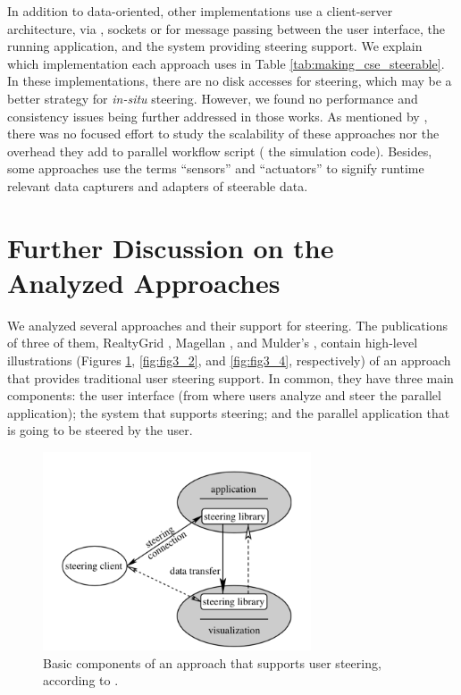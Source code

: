 In addition to data-oriented, other implementations use a client-server
architecture, via , sockets or  for message passing between the
user interface, the running application, and the system providing
steering support. We explain which implementation each approach uses in
Table \ref{tab:making_cse_steerable}. In these implementations, there are no disk accesses for
steering, which may be a better strategy for \emph{in-situ} steering.
However, we found no performance and consistency issues being further
addressed in those works. As mentioned by
\citet{Ayachit2016Performance},
there was no focused effort to study the scalability of these approaches
nor the overhead they add to parallel workflow script (\ie{} the simulation code).
Besides, some approaches \cite{Vetter1999Techniques,Xian2008Computational}
use the terms ``sensors'' and ``actuators'' to signify runtime relevant
data capturers and adapters of steerable data.



\section{Further Discussion on the Analyzed Approaches}

We analyzed several approaches and their support for steering. The publications of three of them, RealtyGrid \cite{Pickles2005practical},
Magellan \cite{Vetter1999Techniques}, 
and Mulder's \cite{MulderSurvey},
contain high-level illustrations (Figures \ref{fig:fig3_1}, \ref{fig:fig3_2}, and \ref{fig:fig3_4}, respectively) of an approach
that provides traditional user steering support.
In common, they have three main
components: the user interface (from where users analyze and steer the
parallel application); the system that supports steering; and the
parallel application that is going to be steered by the user.

\begin{figure}[H]
    \centering
    \includegraphics[width=300px,keepaspectratio]{img/media/image11.png}
    \caption{Basic components of an approach that supports user steering, according to \citet{Pickles2005practical}.}
    \label{fig:fig3_1}
\end{figure}

